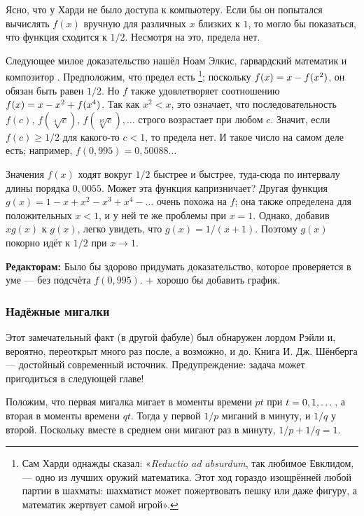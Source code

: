 Ясно, что у Харди не было доступа к компьютеру.
Если бы он попытался вычислять $f(x)$ вручную для различных $x$ близких к $1$, то могло бы показаться, что функция сходится к $1/2$.
Несмотря на это, предела нет.

Следующее милое доказательство нашёл Ноам Элкис, гарвардский математик и композитор \cite[Problem 8]{elkies}.
Предположим, что предел есть%
\footnote{Сам Харди однажды сказал: «\emph{Reductio ad absurdum}, так любимое Евклидом, --- одно из лучших оружий математика.
Этот ход гораздо изощрённей любой партии в шахматы:
шахматист может пожертвовать пешку или даже фигуру, а математик жертвует самой игрой».};
поскольку $f(x)\z=x\z-f(x^2)$, он обязан быть равен $1/2$.
Но $f$ также удовлетворяет соотношению $f(x)\z=x\z-x^2\z+f(x^4)$.
Так как $x^2 < x$, это означает, что последовательность $f(c)$, $f(\sqrt[4]{c})$, $f(\sqrt[16]{c}),\dots$ строго возрастает при любом $c$.
Значит, если $f(c)\ge1/2$ для какого-то $c<1$, то предела нет.
И такое число на самом деле есть; например, $f(0{,}995)=0{,}50088\dots$

Значения $f(x)$ ходят вокруг $1/2$ быстрее и быстрее, туда-сюда по интервалу длины порядка $0{,}0055$. 
Может эта функция капризничает?
Другая функция $g(x)=1-x+x^2-x^3+x^4-\dots$ очень похожа на $f$;
она также определена для положительных $x < 1$, и у ней те же проблемы при $x = 1$.
Однако, добавив $xg(x)$ к $g(x)$, легко увидеть, что $g(x)=1/(x+1)$.
Поэтому $g(x)$ покорно идёт к $1/2$ при $x \to 1$.

\begin{addedbytheeditors}
\textbf{Редакторам:}
Было бы здорово придумать доказательство, которое проверяется в уме --- без подсчёта $f(0{,}995)$.
+ хорошо бы добавить график.
\end{addedbytheeditors}

\subsubsection*{Надёжные мигалки}

Этот замечательный факт (в другой фабуле) был обнаружен лордом Рэйли и, вероятно, переоткрыт много раз после, а возможно, и до.
Книга И. Дж. Шёнберга \cite{52} --- достойный современный источник.
Предупреждение: задача может пригодиться в следующей главе!

Положим, что первая мигалка мигает в моменты времени $pt$ при $t \z= 0, 1, \dots$, а вторая в моменты времени $qt$.
Тогда у первой $1/p$ миганий в минуту, и $1/q$ у второй.
Поскольку вместе в среднем они мигают раз в минуту,  $1/p + 1/q = 1$.


